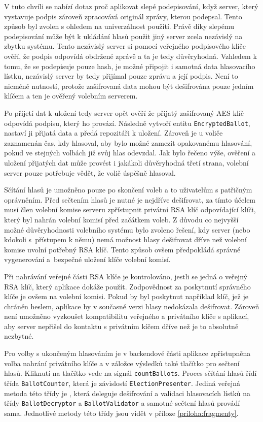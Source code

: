 
V tuto chvíli se nabízí dotaz proč aplikovat slepé podepisování, když server, který vystavuje podpis zároveň zpracovává originál zprávy, kterou podepsal. Tento způsob byl zvolen s ohledem na univerzálnost použití. Právě díky slepému podepisování může být k ukládání hlasů použit jiný server zcela nezávislý na zbytku systému. Tento nezávislý server si pomocí veřejného podpisového klíče ověří, že podpis odpovídá obdržené zprávě a ta je tedy důvěryhodná. Vzhledem k tomu, že se podepisuje pouze hash, je možné připojit i samotná data hlasovacího lístku, nezávislý server by tedy přijímal pouze zprávu a její podpis. Není to nicméně nutností, protože zašifrovaná data mohou být dešifrována pouze jedním klíčem a ten je ověřený volebním serverem.

Po přijetí dat k uložení tedy server opět ověří že přijatý zašifrovaný AES klíč odpovídá podpisu, který ho provází. Následně vytvoří entitu \texttt{EncryptedBallot}, nastaví ji přijatá data a předá repozitáři k uložení. Zároveň je u voliče zaznamenán čas, kdy hlasoval, aby bylo možné zamezit opakovanému hlasování, pokud ve stejných volbách již svůj hlas odevzdal. Jak bylo řečeno výše, ověření a uložení přijatých dat může provést i jakákoli důvěryhodná třetí strana, volební server pouze potřebuje vědět, že volič úspěšně hlasoval.

Sčítání hlasů je umožněno pouze po skončení voleb a to uživatelům s patřičným oprávněním. Před sečtením hlasů je nutné je nejdříve dešifrovat, za tímto účelem musí člen volební komise serveru zpřístupnit privátní RSA klíč odpovídající klíči, který byl nahrán volební komisí před začátkem voleb. Z důvodu co nejvyšší možné důvěryhodnosti volebního systému bylo zvoleno řešení, kdy server (nebo kdokoli s~přístupem k němu) nemá možnost hlasy dešifrovat dříve než volební komise uvolní potřebný RSA klíč. Tento způsob ovšem předpokládá správné vygenerování a~bezpečné uložení klíče volební komisí.

Při nahrávání veřejné části RSA klíče je kontrolováno, jestli se jedná o veřejný RSA klíč, který aplikace dokáže použít. Zodpovědnost za poskytnutí správného klíče je ovšem na volební komisi. Pokud by byl poskytnut například klíč, jež je chráněn heslem, aplikace by v současné verzi hlasy nedokázala dešifrovat. Zároveň není umožněno vyzkoušet kompatibilitu veřejného a privátního klíče s aplikací, aby server nepřišel do kontaktu s privátním kíčem dříve než je to absolutně nezbytné.

Pro volby s ukončeným hlasováním je v backendové části aplikace zpřístupněna volba nahrání privátního klíče a v záložce výsledků také tlačítko pro sečtení hlasů. Kliknutí na tlačítko vede na signál \texttt{countBallots}. Proces sčítání hlasů řídí třída \texttt{BallotCounter}, která je závislostí \texttt{ElectionPresenter}. Jediná veřejná metoda této třídy je %
, která deleguje dešifrování a validaci hlasovacích lístků na třídy \texttt{BallotDecryptor} a \texttt{BallotValidator} a samotné sečtení hlasů provádí sama. Jednotlivé metody této třídy jsou vidět v příloze \ref{priloha:fragmenty}.

